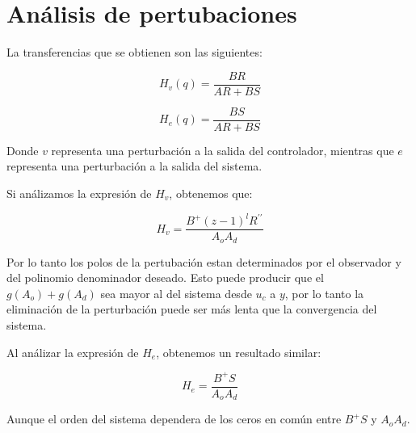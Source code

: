 \section{Análisis de pertubaciones}

La transferencias que se obtienen son las siguientes: 

\begin{equation}
    H_v(q) = \frac{BR}{AR+BS}
\end{equation}

\begin{equation}
    H_e(q) = \frac{BS}{AR+BS}
\end{equation}

Donde $v$ representa una perturbación a la salida del controlador, 
mientras que $e$ representa una perturbación a la salida del sistema.

Si análizamos la expresión de $H_v$, obtenemos que: 

\begin{equation}
    H_v = \frac{B^+(z-1)^lR^{\prime\prime}}{A_oA_d}
\end{equation}

Por lo tanto los polos de la pertubación estan determinados por el observador y del polinomio denominador deseado.
Esto puede producir que el $g(A_o)+g(A_d)$ sea mayor al del sistema desde $u_c$ a $y$, por lo tanto la eliminación 
de la perturbación puede ser más lenta que la convergencia del sistema. 

Al análizar la expresión de $H_e$, obtenemos un resultado similar: 

\begin{equation}
    H_e = \frac{B^+S}{A_oA_d}
\end{equation}

Aunque el orden del sistema dependera de los ceros en común entre $B^+S$ y $A_oA_d$.

